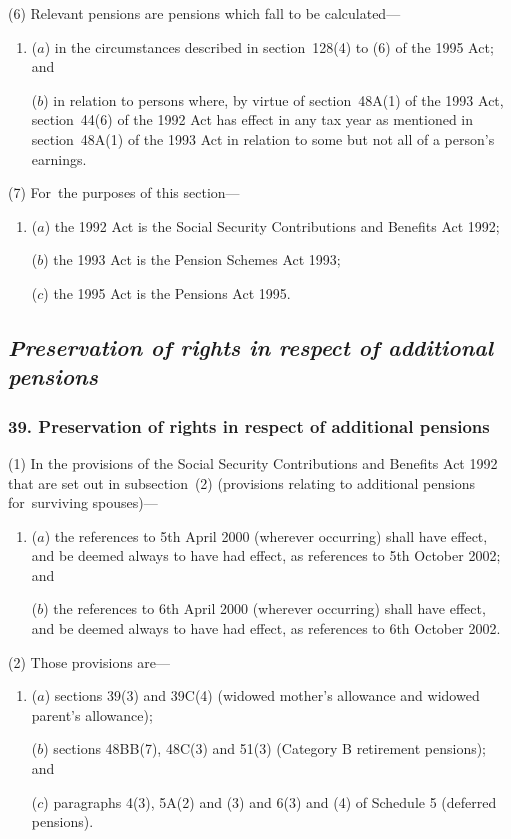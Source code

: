 \documentclass[12pt,a4paper]{article}
\begin{document}
(6) Relevant pensions are pensions which fall to be calculated—
\begin{enumerate}\item[]
($a$) in the circumstances described in section~128(4)  to (6)  of the 1995 Act; and

($b$) in relation to persons where, by virtue of section~48A(1)  of the 1993 Act, section~44(6)  of the 1992 Act has effect in any tax year as mentioned in section~48A(1)  of the 1993 Act in relation to some but not all of a person’s earnings.
\end{enumerate}

(7) For~the purposes of this section—
\begin{enumerate}\item[]
($a$) the 1992 Act is the Social Security Contributions and Benefits Act 1992;

($b$) the 1993 Act is the Pension Schemes Act 1993;

($c$) the 1995 Act is the Pensions Act 1995. 
\end{enumerate}

\subsection{\itshape Preservation of rights in respect of additional pensions}

\subsubsection{39. Preservation of rights in respect of additional pensions}

(1) In the provisions of the Social Security Contributions and Benefits Act 1992 that are set out in subsection~(2)  (provisions relating to additional pensions for~surviving spouses)—
\begin{enumerate}\item[]
($a$) the references to 5th April 2000 (wherever occurring) shall have effect, and be deemed always to have had effect, as references to 5th October 2002; and

($b$) the references to 6th April 2000 (wherever occurring) shall have effect, and be deemed always to have had effect, as references to 6th October 2002. 
\end{enumerate}

(2) Those provisions are—
\begin{enumerate}\item[]
($a$) sections 39(3)  and 39C(4)  (widowed mother’s allowance and widowed parent’s allowance);

($b$) sections 48BB(7), 48C(3)  and 51(3)  (Category B retirement pensions); and

($c$) paragraphs 4(3), 5A(2)  and (3)  and 6(3)  and (4)  of Schedule 5 (deferred pensions).
\end{enumerate}
\end{document}
